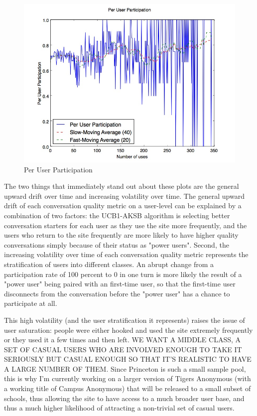 \begin{figure}[H]
\centering
\includegraphics[trim= 0mm 0mm 0mm 0mm, clip, scale=0.5]{./Figures/PerUserParticipation.jpg}
\caption{Per User Participation}
\label{fig:PerUserParticipation}
\end{figure}

The two things that immediately stand out about these plots are the general upward drift over time and increasing volatility over time. The general upward drift of each conversation quality metric on a user-level can be explained by a combination of two factors: the UCB1-AKSB algorithm is selecting better conversation starters for each user as they use the site more frequently, and the users who return to the site frequently are more likely to have higher quality conversations simply because of their status as "power users". Second, the increasing volatility over time of each conversation quality metric represents the stratification of users into different classes. An abrupt change from a participation rate of 100 percent to 0 in one turn is more likely the result of a "power user" being paired with an first-time user, so that the first-time user disconnects from the conversation before the "power user" has a chance to participate at all.

This high volatility (and the user stratification it represents) raises the issue of user saturation: people were either hooked and used the site extremely frequently or they used it a few times and then left. WE WANT A MIDDLE CLASS, A SET OF CASUAL USERS WHO ARE INVOLVED ENOUGH TO TAKE IT SERIOUSLY BUT CASUAL ENOUGH SO THAT IT'S REALISTIC TO HAVE A LARGE NUMBER OF THEM. Since Princeton is such a small sample pool, this is why I'm currently working on a larger version of Tigers Anonymous (with a working title of Campus Anonymous) that will be released to a small subset of schools, thus allowing the site to have access to a much broader user base, and thus a much higher likelihood of attracting a non-trivial set of casual users.
